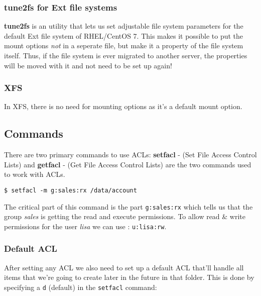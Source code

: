 \subsubsection{tune2fs for Ext file systems}
\vspace{-10pt}
\textbf{tune2fs} is an utility that lets us set adjustable file system parameters for the default Ext file system of RHEL/CentOS 7. This makes it possible to put the mount options \textit{not} in a seperate file, but make it a property of the file system itself. Thus, if the file system is ever migrated to another server, the properties will be moved with it and not need to be set up again!
\vspace{-10pt}

\subsubsection{XFS}
In XFS, there is no need for mounting options as it's a default  mount option.
\vspace{-10pt}

\subsection{Commands} 
There are two primary commands to use ACLs:	\textbf{setfacl} - (Set File Access Control Lists) and \textbf{getfacl} - (Get File Access Control Lists) are the two commands used to work with ACLs. 

\vspace{-15pt}
\begin{verbatim}
$ setfacl -m g:sales:rx /data/account
\end{verbatim}
\vspace{-10pt}

\noindent
The critical part of this command is the part \verb|g:sales:rx| which tells us that the group \textit{sales} is getting the read and execute permissions. To allow read \& write permissions for the user \textit{lisa} we can use : \verb|u:lisa:rw|. 
\vspace{-10pt}

\subsubsection{Default ACL}
After setting any ACL we also need to set up a default ACL that'll handle all items that we're going to create later in the future in that folder. This is done by specifying a \verb|d| (default) in the \verb|setfacl| command:

